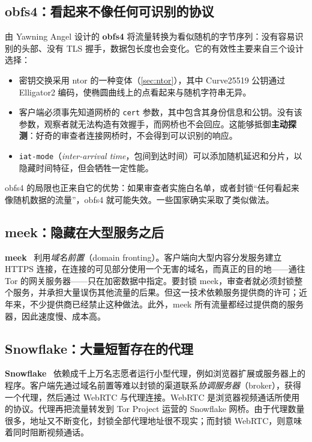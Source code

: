 \subsection{obfs4：看起来不像任何可识别的协议}

由 Yawning Angel 设计的 \textbf{obfs4} 将流量转换为看似随机的字节序列：没有容易识别的头部、没有 TLS 握手，数据包长度也会变化。它的有效性主要来自三个设计选择：
\begin{itemize}
  \item 密钥交换采用 ntor 的一种变体（\cref{sec:ntor}），其中 Curve25519 公钥通过 Elligator2 编码，使椭圆曲线上的点看起来与随机字符串无异。
  \item 客户端必须事先知道网桥的 \texttt{cert} 参数，其中包含其身份信息和公钥。没有该参数，观察者就无法构造有效握手，而网桥也不会回应。这能够抵御\textbf{主动探测}：好奇的审查者连接网桥时，不会得到可以识别的响应。
  \item \texttt{iat-mode}（\emph{inter-arrival time}，包间到达时间）可以添加随机延迟和分片，以隐藏时间特征，但会牺牲一定性能。
\end{itemize}
obfs4 的局限也正来自它的优势：如果审查者实施白名单，或者封锁\enquote{任何看起来像随机数据的流量}，obfs4 就可能失效。一些国家确实采取了类似做法。

\subsection{meek：隐藏在大型服务之后}

\textbf{meek}~\cite{fifield2015fronting} 利用\emph{域名前置}（domain fronting）。客户端向大型内容分发服务建立 HTTPS 连接，在连接的可见部分使用一个无害的域名，而真正的目的地——通往 Tor 的网关服务器——只在加密数据中指定。要封锁 meek，审查者就必须封锁整个服务，并承担大量误伤其他流量的后果。但这一技术依赖服务提供商的许可；近年来，不少提供商已经禁止这种做法。此外，meek 所有流量都经过提供商的服务器，因此速度慢、成本高。

\subsection{Snowflake：大量短暂存在的代理}

\textbf{Snowflake}~\cite{bocovich2024snowflake} 依赖成千上万名志愿者运行小型代理，例如浏览器扩展或服务器上的程序。客户端先通过域名前置等难以封锁的渠道联系\emph{协调服务器}（broker），获得一个代理，然后通过 WebRTC 与代理连接。WebRTC 是浏览器视频通话所使用的协议。代理再把流量转发到 Tor Project 运营的 Snowflake 网桥。由于代理数量很多，地址又不断变化，封锁全部代理地址很不现实；而封锁 WebRTC，则意味着同时阻断视频通话。

